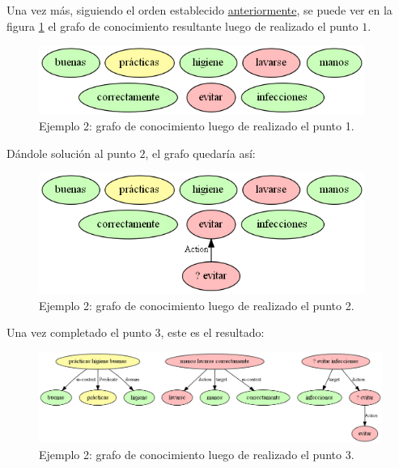 Una vez más, siguiendo el orden establecido \hyperref[enum:knowledge_graph_build_order]{anteriormente}, se puede ver en la figura \ref{fig:knowledge_graph2.1} el grafo de conocimiento resultante luego de realizado el punto $1$.

\begin{figure}[H]
	\begin{center}
		\includegraphics[width=4.2in]{graphics/knowledge_graph_example2_1.png}
		\caption[Ejemplo 2: grafo de conocimiento luego de realizado el punto 1]{Ejemplo 2: grafo de conocimiento luego de realizado el punto 1.}
		\label{fig:knowledge_graph2.1}
	\end{center}
\end{figure}

Dándole solución al punto $2$, el grafo quedaría así:
\begin{figure}[H]
	\begin{center}
		\includegraphics[width=4.2in]{graphics/knowledge_graph_example2_2.png}
		\caption[Ejemplo 2: grafo de conocimiento luego de realizado el punto 2]{Ejemplo 2: grafo de conocimiento luego de realizado el punto 2.}
		\label{fig:knowledge_graph2.2}
	\end{center}
\end{figure}

Una vez completado el punto $3$, este es el resultado:
\begin{figure}[H]
	\begin{center}
		\includegraphics[width=\textwidth]{graphics/knowledge_graph_example2_3.png}
		\caption[Ejemplo 2: grafo de conocimiento luego de realizado el punto 3]{Ejemplo 2: grafo de conocimiento luego de realizado el punto 3.}
		\label{fig:knowledge_graph2.3}
	\end{center}
\end{figure}

